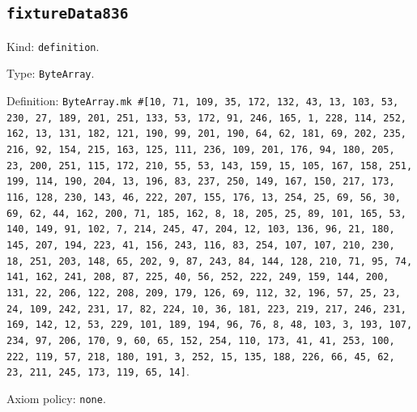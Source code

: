 \documentclass[11pt]{article}
\begin{document}
\subsection*{\texttt{fixtureData836}}
\noindent Kind: \texttt{definition}.\par
\noindent Type: \texttt{ByteArray}.\par
\noindent Definition: \texttt{ByteArray.mk \#[10, 71, 109, 35, 172, 132, 43, 13, 103, 53, 230, 27, 189, 201, 251, 133, 53, 172, 91, 246, 165, 1, 228, 114, 252, 162, 13, 131, 182, 121, 190, 99, 201, 190, 64, 62, 181, 69, 202, 235, 216, 92, 154, 215, 163, 125, 111, 236, 109, 201, 176, 94, 180, 205, 23, 200, 251, 115, 172, 210, 55, 53, 143, 159, 15, 105, 167, 158, 251, 199, 114, 190, 204, 13, 196, 83, 237, 250, 149, 167, 150, 217, 173, 116, 128, 230, 143, 46, 222, 207, 155, 176, 13, 254, 25, 69, 56, 30, 69, 62, 44, 162, 200, 71, 185, 162, 8, 18, 205, 25, 89, 101, 165, 53, 140, 149, 91, 102, 7, 214, 245, 47, 204, 12, 103, 136, 96, 21, 180, 145, 207, 194, 223, 41, 156, 243, 116, 83, 254, 107, 107, 210, 230, 18, 251, 203, 148, 65, 202, 9, 87, 243, 84, 144, 128, 210, 71, 95, 74, 141, 162, 241, 208, 87, 225, 40, 56, 252, 222, 249, 159, 144, 200, 131, 22, 206, 122, 208, 209, 179, 126, 69, 112, 32, 196, 57, 25, 23, 24, 109, 242, 231, 17, 82, 224, 10, 36, 181, 223, 219, 217, 246, 231, 169, 142, 12, 53, 229, 101, 189, 194, 96, 76, 8, 48, 103, 3, 193, 107, 234, 97, 206, 170, 9, 60, 65, 152, 254, 110, 173, 41, 41, 253, 100, 222, 119, 57, 218, 180, 191, 3, 252, 15, 135, 188, 226, 66, 45, 62, 23, 211, 245, 173, 119, 65, 14]}.\par
\noindent Axiom policy: \texttt{none}.\par
\end{document}
